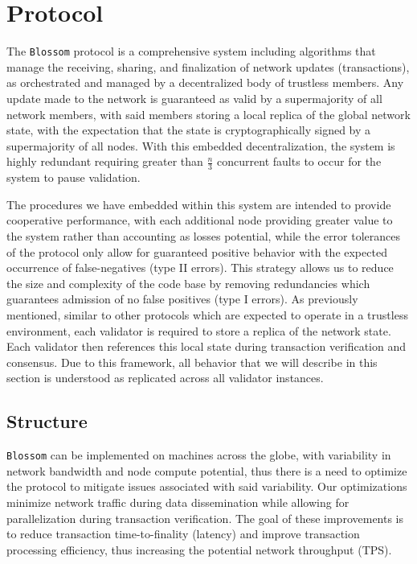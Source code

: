 \section{Protocol}\label{proto}
The \texttt{Blossom} protocol is a comprehensive system including algorithms that manage the receiving, sharing, and finalization of network updates (transactions), as orchestrated and managed by a decentralized body of trustless members. Any update made to the network is guaranteed as valid by a supermajority of all network members, with said members storing a local replica of the global network state, with the expectation that the state is cryptographically signed by a supermajority of all nodes. With this embedded decentralization, the system is highly redundant requiring greater than \(\frac{n}{3}\) concurrent faults to occur for the system to pause validation.

The procedures we have embedded within this system are intended to provide cooperative performance, with each additional node providing greater value to the system rather than accounting as losses potential, while the error tolerances of the protocol only allow for guaranteed positive behavior with the expected occurrence of false-negatives (type II errors). This strategy allows us to reduce the size and complexity of the code base by removing redundancies which guarantees admission of no false positives (type I errors).
As previously mentioned, similar to other protocols which are expected to operate in a trustless environment, each validator is required to store a replica of the network state. Each validator then references this local state during transaction verification and consensus. Due to this framework, all behavior that we will describe in this section is understood as replicated across all validator instances.

\subsection{Structure}\label{struc}
\texttt{Blossom} can be implemented on machines across the globe, with variability in network bandwidth and node compute potential, thus there is a need to optimize the protocol to mitigate issues associated with said variability. Our optimizations minimize network traffic during data dissemination while allowing for parallelization during transaction verification. The goal of these improvements is to reduce transaction time-to-finality (latency) and improve transaction processing efficiency, thus increasing the potential network throughput (TPS).

